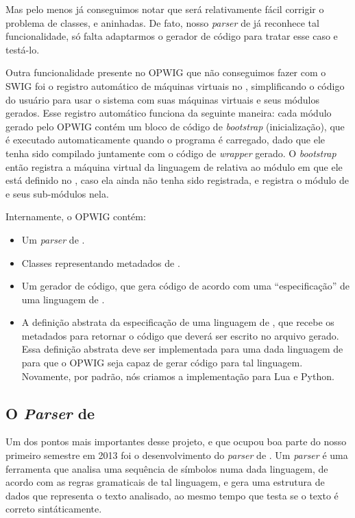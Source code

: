   Mas pelo menos já conseguimos notar que será relativamente fácil corrigir o problema de classes, 
   e  aninhadas. De fato, nosso \textit{parser} de \CXX{} já reconhece
  tal funcionalidade, só falta adaptarmos o gerador de código para tratar esse caso e testá-lo.
  
  Outra funcionalidade presente no OPWIG que não conseguimos fazer com o SWIG foi o registro automático
  de máquinas virtuais no \SMgr{}, simplificando o código do usuário para usar o sistema com suas máquinas
  virtuais e seus módulos gerados. Esse registro automático funciona da seguinte maneira: cada módulo gerado
  pelo OPWIG contém um bloco de código de \textit{bootstrap} (inicialização), que é executado automaticamente
  quando o programa é carregado, dado que ele tenha sido compilado juntamente com o código de \textit{wrapper}
  gerado. O \textit{bootstrap} então registra a máquina virtual da linguagem de \script{} relativa ao módulo
  em que ele está definido no \SMgr{}, caso ela ainda não tenha sido registrada, e registra o módulo de
  \script{} e seus sub-módulos nela.
  
  Internamente, o OPWIG contém:
  \begin{itemize}
    \item Um \textit{parser} de \CXX{}.
    \item Classes representando metadados de \CXX{}.
    \item Um gerador de código, que gera código de acordo com uma ``especificação''
      de uma linguagem de \script{}.
    \item A definição abstrata da especificação de uma linguagem de \script{}, que recebe
      os metadados para retornar o código que deverá ser escrito no arquivo gerado. Essa
      definição abstrata deve ser implementada para uma dada linguagem de \script{} para
      que o OPWIG seja capaz de gerar código para tal linguagem. Novamente, por padrão, nós
      criamos a implementação para Lua e Python.
  \end{itemize}
  
  \subsection{O \textit{Parser} de \CXX{}}
  Um dos pontos mais importantes desse projeto, e que ocupou boa parte do nosso primeiro semestre em 2013
  foi o desenvolvimento do \textit{parser} de \CXX{}. Um \textit{parser} é uma ferramenta que analisa uma
  sequência de símbolos numa dada linguagem, de acordo com as regras gramaticais de tal linguagem, e gera 
  uma estrutura de dados que representa o texto analisado, ao mesmo tempo que testa se o texto é 
  correto sintáticamente.
  
